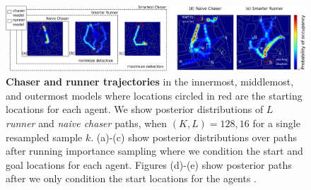 \documentclass{article}
\begin{document}
\begin{figure}
\begin{center}
\centerline{\includegraphics[width=2.0\columnwidth]{occupancy_diagram.pdf}}
\caption{ \textbf{Chaser and runner trajectories} in the innermost, middlemost, and outermost models where locations circled in red are the starting locations for each agent. We show posterior distributions of $L$ \textit{runner} and \textit{naive chaser} paths, when $(K,L) = 128, 16$ for a single resampled sample $k$. (a)-(c) show posterior distributions over paths after running importance sampling where we condition the start and goal locations for each agent. Figures (d)-(e) show posterior paths after we only condition the start locations for the agents . %
}
\label{fig:progression}
\end{center}
\vspace{-1em}
\end{figure} 
\end{document}

